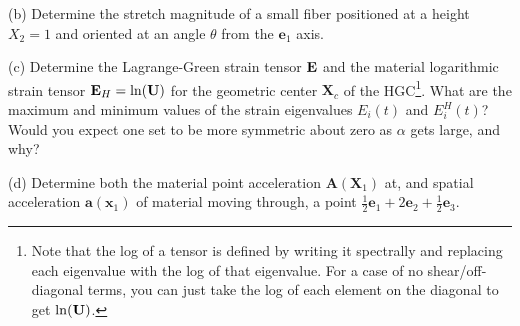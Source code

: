 \medskip
(b) Determine the stretch magnitude of a small fiber positioned at a height $X_2 = 1$ and oriented at an angle $\theta$ from the $\bm{e}_1$ axis. 

\medskip
(c) Determine the Lagrange-Green strain tensor $\mathbf{E}$ and the material logarithmic strain tensor $\mathbf{E}_H = \ln (\mathbf{U})$ for the geometric center $\bm{X}_c$ of the HGC\footnote{Note that the log of a tensor is defined by writing it spectrally and replacing each eigenvalue with the log of that eigenvalue. For a case of no shear/off-diagonal terms, you can just take the log of each element on the diagonal to get $\ln(\mathbf{U})$.}. 
What are the maximum and minimum values of the strain eigenvalues $E_i(t)$ and $E_i^H(t)$? 
Would you expect one set to be more symmetric about zero as $\alpha$ gets large, and why?

\medskip
(d) Determine both the material point acceleration $\bm{A}(\bm{X}_1)$ at, and spatial acceleration $\bm{a}(\bm{x}_1)$ of material moving through, a point $\frac{1}{2} \bm{e}_1 + 2\bm{e}_2 + \frac{1}{2} \bm{e}_3$.  

\begin{figure}
\centering
{}
\end{figure}

